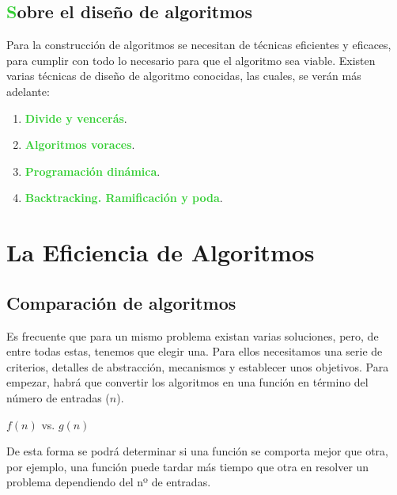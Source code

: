\documentclass[10pt,a4paper,spanish]{report}
\theoremstyle{definition}
\theoremstyle{remark}
\begin{document}
    \section{\textcolor{LimeGreen}Sobre el diseño de algoritmos}

    Para la construcción de algoritmos se necesitan de técnicas eficientes y eficaces, para cumplir con todo lo necesario para que el algoritmo sea viable. Existen varias técnicas de diseño de algoritmo conocidas, las cuales, se verán más adelante:

    \begin{enumerate}[$ \clubsuit $]
        \item \textbf{\textcolor{LimeGreen}{Divide y vencerás}}.
        \item \textbf{\textcolor{LimeGreen}{Algoritmos voraces}}.
        \item \textbf{\textcolor{LimeGreen}{Programación dinámica}}.
        \item \textbf{\textcolor{LimeGreen}{Backtracking. Ramificación y poda}}.
    \end{enumerate}

    \chapter{\textcolor{YellowOrange}La Eficiencia de Algoritmos}

    \section{\textcolor{YellowOrange}Comparación de algoritmos}
    
    Es frecuente que para un mismo problema existan varias soluciones, pero, de entre todas estas, tenemos que elegir una. Para ellos necesitamos una serie de criterios, detalles de abstracción, mecanismos y establecer unos objetivos. Para empezar, habrá que convertir los algoritmos en una función en término del número de entradas ($n$).

    \begin{center}
        {\Large{$f(n)$ vs. $g(n)$\\}}
    \end{center}

    De esta forma se podrá determinar si una función se comporta mejor que otra, por ejemplo, una función puede tardar más tiempo que otra en resolver un problema dependiendo del nº de entradas.

    \begin{center}
    
    \end{center}
\end{document}
